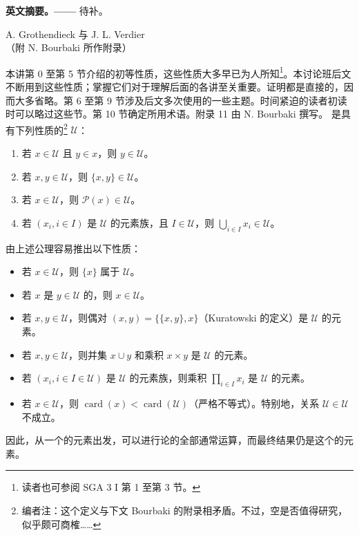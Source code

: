 \textbf{英文摘要。——} 待补。
\begin{center}A. Grothendieck 与 J. L. Verdier\\（附 N. Bourbaki 所作附录）\end{center}
本讲第 0 至第 5 节介绍的初等性质，这些性质大多早已为人所知\begingroup\renewcommand{\thefootnote}{\ensuremath{*}}\footnote{读者也可参阅 SGA 3 I 第 1 至第 3 节。}\endgroup 。本讨论班后文不断用到这些性质；掌握它们对于理解后面的各讲至关重要。证明都是直接的，因而大多省略。第 6 至第 9 节涉及后文多次使用的一些主题。时间紧迫的读者初读时可以略过这些节。第 10 节确定所用术语。附录 11 由 N. Bourbaki 撰写。
是具有下列性质的\footnote[1]{编者注：这个定义与下文 Bourbaki 的附录相矛盾。不过，空是否值得研究，似乎颇可商榷……} $\mathcal U$：
\begin{enumerate}
\item[(U 1)] 若 $x\in\mathcal U$ 且 $y\in x$，则 $y\in\mathcal U$。
\item[(U 2)] 若 $x,y\in\mathcal U$，则 $\{x,y\}\in\mathcal U$。
\item[(U 3)] 若 $x\in\mathcal U$，则 $\mathcal P(x)\in\mathcal U$。
\item[(U 4)] 若 $(x_i,i\in I)$ 是 $\mathcal U$ 的元素族，且 $I\in\mathcal U$，则 $\bigcup_{i\in I}x_i\in\mathcal U$。
\end{enumerate}
由上述公理容易推出以下性质：
\begin{itemize}
\item 若 $x\in\mathcal U$，则 $\{x\}$ 属于 $\mathcal U$。
\item 若 $x$ 是 $y\in\mathcal U$ 的，则 $x\in\mathcal U$。
\item 若 $x,y\in\mathcal U$，则偶对 $(x,y)=\{\{x,y\},x\}$（Kuratowski 的定义）是 $\mathcal U$ 的元素。
\item 若 $x,y\in\mathcal U$，则并集 $x\cup y$ 和乘积 $x\times y$ 是 $\mathcal U$ 的元素。
\item 若 $(x_i,i\in I\in\mathcal U)$ 是 $\mathcal U$ 的元素族，则乘积 $\prod_{i\in I}x_i$ 是 $\mathcal U$ 的元素。
\item 若 $x\in\mathcal U$，则 $\operatorname{card}(x)<\operatorname{card}(\mathcal U)$（严格不等式）。特别地，关系 $\mathcal U\in\mathcal U$ 不成立。
\end{itemize}
因此，从一个的元素出发，可以进行论的全部通常运算，而最终结果仍是这个的元素。

